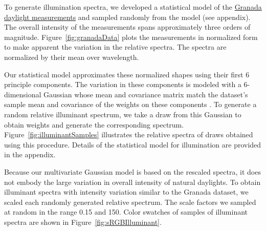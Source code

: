 \documentclass{jov}
\begin{document}
To generate illumination spectra, we developed a statistical model of the \href{http://colorimaginglab.ugr.es/pages/Data}{Granada daylight measurements} \cite{hernandez2001color} and sampled randomly from the model (see appendix).
The overall intensity of the measurements spans approximately three orders of magnitude.
Figure~\ref{fig:granadaData} plots the measurements in normalized form to make apparent the variation in the relative spectra. The spectra are normalized by their mean over wavelength.

Our statistical model approximates these normalized shapes using their first 6 principle components.
The variation in these components is modeled with a 6-dimensional Gaussian whose mean and covariance matrix 
match the dataset's sample mean and covariance of the weights on these components \cite{BrainardFreeman}.
To generate a random relative illuminant spectrum, we take a draw from this Gaussian to obtain weights and generate the corresponding spectrum.
Figure~\ref{fig:illuminantSamples} illustrates the relative spectra of draws obtained using this procedure.
Details of the statistical model for illumination are provided in the appendix.

Because our multivariate Gaussian model is based on the rescaled spectra, it does not embody the large variation in overall intensity of natural daylights.
To obtain illuminant spectra with intensity variation similar to the Granada dataset, we scaled each randomly generated relative spectrum.
The scale factors we sampled at random in the range 0.15 and 150.
Color swatches of samples of illuminant spectra are shown in Figure~\ref{fig:sRGBIlluminant}.
\end{document}
